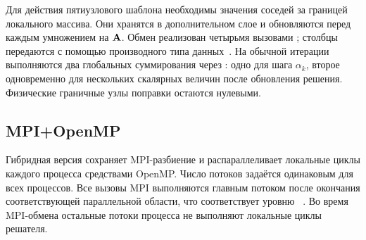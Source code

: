 Для действия пятиузлового шаблона необходимы значения соседей за границей локального массива.
Они хранятся в дополнительном слое и обновляются перед каждым умножением на $\mathbf{A}$.
Обмен реализован четырьмя вызовами ; столбцы передаются с помощью производного типа данных~\cite{mpi}.
На обычной итерации выполняются два глобальных суммирования через : одно для шага $\alpha_k$, второе одновременно для нескольких скалярных величин после обновления решения.
Физические граничные узлы поправки остаются нулевыми.

\subsection{MPI+OpenMP}

Гибридная версия сохраняет MPI-разбиение и распараллеливает локальные циклы каждого процесса средствами OpenMP.
Число потоков задаётся одинаковым для всех процессов.
Все вызовы MPI выполняются главным потоком после окончания соответствующей параллельной области, что соответствует уровню ~\cite{mpi}.
Во время MPI-обмена остальные потоки процесса не выполняют локальные циклы решателя.
